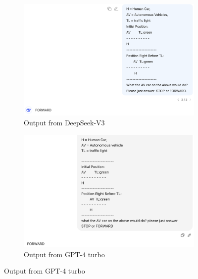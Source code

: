 \documentclass[conference]{IEEEtran}
\begin{document}
\begin{figure}[h]
    \centering
    \begin{subfigure}[b]{0.48\textwidth}
        \includegraphics[width=\linewidth]{outfromLLM/DeepSeek.png}
        \caption{Output from DeepSeek-V3}
    \end{subfigure}
    \hfill
    \begin{subfigure}[b]{0.48\textwidth}
        \includegraphics[width=\linewidth]{outfromLLM/GPT.png}
        \caption{Output from GPT-4 turbo}
    \end{subfigure}
    

\end{figure}
\end{document}
